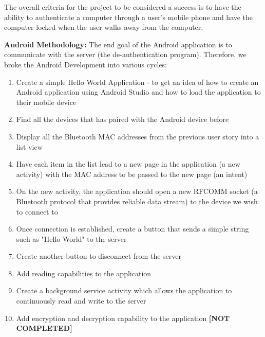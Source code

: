 \documentclass[letterpaper,twocolumn,10pt]{article}
\begin{document}
The overall criteria for the project to be considered a success is to have the ability to authenticate a computer through a user's mobile phone and have the computer locked when the user walks away from the computer.

\textbf{Android Methodology:} The end goal of the Android application is to communicate with the server (the de-authentication program). Therefore, we broke the Android Development into various cycles:
\begin{enumerate}
\item Create a simple Hello World Application - to get an idea of how to create an Android application using Android Studio and how to load the application to their mobile device
\item Find all the devices that has paired with the Android device before
\item Display all the Bluetooth MAC addresses from the previous user story into a list view
\item Have each item in the list lead to a new page in the application (a new activity) with the MAC address to be passed to the new page (an intent)
\item On the new activity, the application should open a new RFCOMM socket (a Bluetooth protocol that provides reliable data stream) to the device we wish to connect to
\item  Once connection is established, create a button that sends a simple string such as "Hello World" to the server
\item Create another button to disconnect from the server
\item Add reading capabilities to the application
\item Create a background service activity which allows the application to continuously  read and write to the server
\item Add encryption and decryption capability to the application \textbf{[NOT COMPLETED]}
\end{enumerate}

\hrulefill
\end{document}
